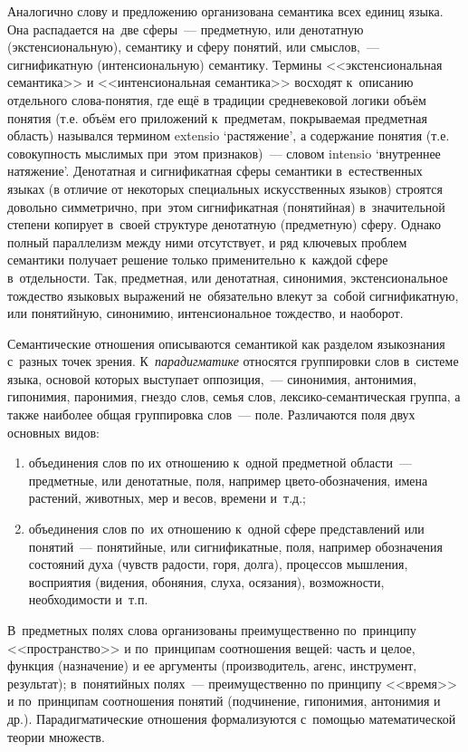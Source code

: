 \documentclass[12pt]{article}
\theoremstyle{definition}
\theoremstyle{remark}
\numberwithin{equation}{section}
\begin{document}
Аналогично слову и предложению организована семантика всех единиц языка. 
Она распадается на~две сферы~--- предметную, или денотатную (экстенсиональную), 
семантику и сферу понятий, или смыслов,~--- сигнификатную (интенсиональную) 
семантику. Термины <<экстенсиональная семантика>> и <<интенсиональная семантика>> 
восходят к~описанию отдельного слова-понятия, где ещё в традиции средневековой 
логики объём понятия (т.е. объём его приложений к~предметам, покрываемая 
предметная область) назывался термином extensio ‘растяжение’, а содержание 
понятия (т.е. совокупность мыслимых при~этом признаков)~--- словом intensio 
‘внутреннее натяжение’. Денотатная и сигнификатная сферы семантики в~естественных 
языках (в отличие от некоторых специальных искусственных языков) строятся 
довольно симметрично, при~этом сигнификатная (понятийная) в~значительной 
степени копирует в~своей структуре денотатную (предметную) сферу. Однако 
полный параллелизм между ними отсутствует, и ряд ключевых проблем семантики 
получает решение только применительно к~каждой сфере в~отдельности. Так, 
предметная, или денотатная, синонимия, экстенсиональное тождество языковых 
выражений не~обязательно влекут за~собой сигнификатную, или понятийную, 
синонимию, интенсиональное тождество, и наоборот. 

Семантические отношения описываются семантикой как разделом языкознания 
с~разных точек зрения. К~{\sl парадигматике} относятся группировки слов в~системе 
языка, основой которых выступает оппозиция,~--- синонимия, антонимия, гипонимия, 
паронимия, гнездо слов, семья слов, лексико-семантическая группа, а также 
наиболее общая группировка слов~--- поле. Различаются поля двух основных 
видов: 
\begin{enumerate}
    \item объединения слов по их отношению к~одной предметной области~--- 
    предметные, или денотатные, поля, например цвето-обозначения, имена 
    растений, животных, мер и весов, времени и~т.д.; 
    \item объединения слов по~их отношению к~одной сфере представлений или 
    понятий~--- понятийные, или сигнификатные, поля, например обозначения 
    состояний духа (чувств радости, горя, долга), процессов мышления, 
    восприятия (видения, обоняния, слуха, осязания), возможности, необходимости 
    и~т.п. 
\end{enumerate}
В~предметных полях слова организованы преимущественно по~принципу <<пространство>>
и по~принципам соотношения вещей: часть и целое, функция (назначение) и ее 
аргументы (производитель, агенс, инструмент, результат); в~понятийных полях~--- 
преимущественно по принципу <<время>> и по~принципам соотношения понятий 
(подчинение, гипонимия, антонимия и др.). Парадигматические отношения 
формализуются с~помощью математической теории множеств.
\end{document}
